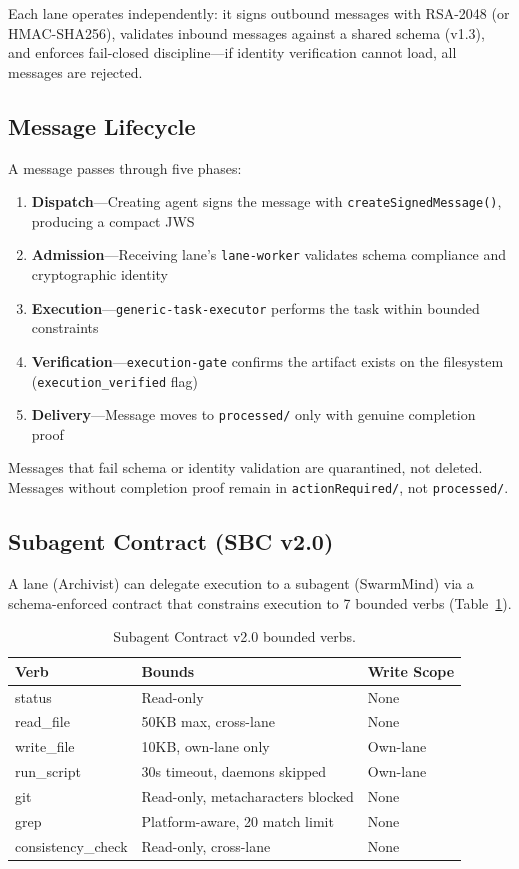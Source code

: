 \documentclass[11pt,letterpaper]{article}
\begin{document}
Each lane operates independently: it signs outbound messages with RSA-2048 (or HMAC-SHA256), validates inbound messages against a shared schema (v1.3), and enforces fail-closed discipline---if identity verification cannot load, all messages are rejected.

\subsection{Message Lifecycle}

A message passes through five phases:

\begin{enumerate}[nosep]
  \item \textbf{Dispatch}---Creating agent signs the message with \texttt{createSignedMessage()}, producing a compact JWS
  \item \textbf{Admission}---Receiving lane's \texttt{lane-worker} validates schema compliance and cryptographic identity
  \item \textbf{Execution}---\texttt{generic-task-executor} performs the task within bounded constraints
  \item \textbf{Verification}---\texttt{execution-gate} confirms the artifact exists on the filesystem (\texttt{execution\_verified} flag)
  \item \textbf{Delivery}---Message moves to \texttt{processed/} only with genuine completion proof
\end{enumerate}

Messages that fail schema or identity validation are quarantined, not deleted. Messages without completion proof remain in \texttt{actionRequired/}, not \texttt{processed/}.

\subsection{Subagent Contract (SBC v2.0)}

A lane (Archivist) can delegate execution to a subagent (SwarmMind) via a schema-enforced contract that constrains execution to 7 bounded verbs (Table~\ref{tab:sbc}).

\begin{table}[h]
\centering
\caption{Subagent Contract v2.0 bounded verbs.}
\label{tab:sbc}
\begin{tabular}{lll}
\toprule
\textbf{Verb} & \textbf{Bounds} & \textbf{Write Scope} \\
\midrule
status & Read-only & None \\
read\_file & 50KB max, cross-lane & None \\
write\_file & 10KB, own-lane only & Own-lane \\
run\_script & 30s timeout, daemons skipped & Own-lane \\
git & Read-only, metacharacters blocked & None \\
grep & Platform-aware, 20 match limit & None \\
consistency\_check & Read-only, cross-lane & None \\
\bottomrule
\end{tabular}
\end{table}
\end{document}
